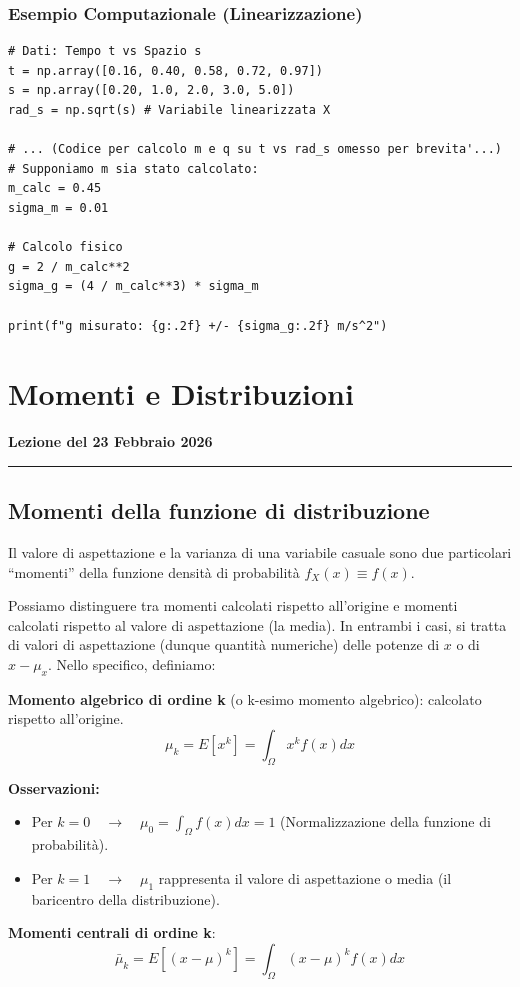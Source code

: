 \documentclass{article}
\theoremstyle{remark}
\newcommand{\thelezione}{}
\newcommand{\lezione}[2]{
\newpage
\renewcommand{\thelezione}{#2} 
\section{#1} 
\noindent\textbf{\color{RoyalBlue}Lezione del #2}\par\vspace{0.5em}\hrule\vspace{1em}
}
\begin{document}
\subsubsection*{Esempio Computazionale (Linearizzazione)}
\begin{lstlisting}[caption={Linearizzazione per calcolo di g}]
# Dati: Tempo t vs Spazio s
t = np.array([0.16, 0.40, 0.58, 0.72, 0.97]) 
s = np.array([0.20, 1.0, 2.0, 3.0, 5.0])
rad_s = np.sqrt(s) # Variabile linearizzata X

# ... (Codice per calcolo m e q su t vs rad_s omesso per brevita'...)
# Supponiamo m sia stato calcolato:
m_calc = 0.45 
sigma_m = 0.01

# Calcolo fisico
g = 2 / m_calc**2
sigma_g = (4 / m_calc**3) * sigma_m

print(f"g misurato: {g:.2f} +/- {sigma_g:.2f} m/s^2")
\end{lstlisting}




\lezione{Momenti e Distribuzioni}{23 Febbraio 2026}



\subsection{Momenti della funzione di distribuzione}



Il valore di aspettazione e la varianza di una variabile casuale sono due particolari “momenti” della funzione densità di probabilità $f_X(x) \equiv f(x)$.

Possiamo distinguere tra momenti calcolati rispetto all’origine e momenti calcolati rispetto al valore di aspettazione (la media). In entrambi i casi, si tratta di valori di aspettazione (dunque quantità numeriche) delle potenze di $x$ o di $x-\mu_x$. 
Nello specifico, definiamo:
   
\begin{definizione} \textbf{Momento algebrico di ordine k} (o k-esimo momento algebrico): calcolato rispetto all'origine.
\[
\mu_k=E[x^k]=\int_\Omega x^k f(x) dx
\]
\end{definizione}

\textbf{Osservazioni:}
\begin{itemize}
    \item Per $k=0 \quad \to \quad  \mu_0 =\int_\Omega f(x) dx =1$ (Normalizzazione della funzione di probabilità).
    \item Per $k=1 \quad \to \quad \mu_1$ rappresenta il valore di aspettazione o media (il baricentro della distribuzione).
\end{itemize}
\begin{definizione}
\textbf{Momenti centrali di ordine k}:
\[
\bar{\mu}_k=E[(x-\mu)^k]=\int_\Omega (x-\mu)^k f(x) dx
\]
\end{definizione}
\end{document}
